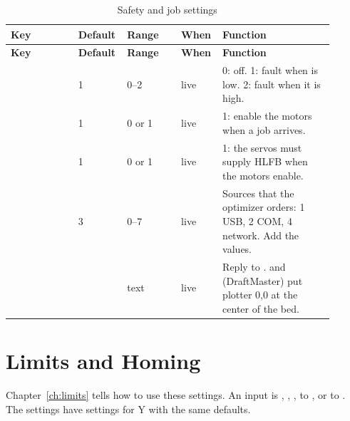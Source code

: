 \begin{longtable}{@{}P{0.2\linewidth}P{0.11\linewidth}P{0.16\linewidth}P{0.1\linewidth}P{0.33\linewidth}@{}}
\caption{Safety and job settings}\label{tab:set-safety}\\
\toprule
\textbf{Key} & \textbf{Default} & \textbf{Range} & \textbf{When} & \textbf{Function} \\
\midrule
\endfirsthead
\toprule
\textbf{Key} & \textbf{Default} & \textbf{Range} & \textbf{When} & \textbf{Function} \\
\midrule
\endhead
\bottomrule
\endfoot
{} & 1 & 0--2 & live & 0: off. 1: fault when  is low. 2: fault when it is high. \\
 & 1 & 0 or 1 & live & 1: enable the motors when a job arrives. \\
 & 1 & 0 or 1 & live & 1: the servos must supply HLFB when the motors enable. \\
 & 3 & 0--7 & live & Sources that the optimizer orders: 1 USB, 2 COM, 4 network. Add the values. \\
 &  & text & live & Reply to .  and  (DraftMaster) put plotter 0,0 at the center of the bed. \\
\end{longtable}

\section{Limits and Homing}

Chapter~\ref{ch:limits} tells how to use these settings. An input is
, , ,  to , or
 to . The  settings have 
settings for Y with the same defaults.

